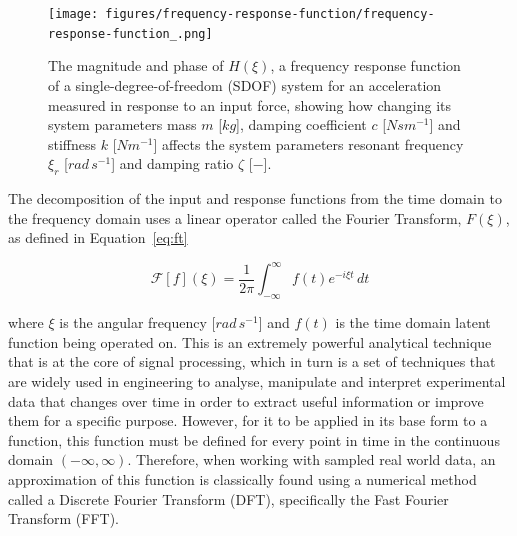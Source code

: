 \documentclass[12pt]{article}
\begin{document}
    \begin{figure}[ht]
        \centering
        \texttt{[image: figures/frequency-response-function/frequency-response-function\_.png]}
        \caption{The magnitude and phase of $H(\xi)$, a frequency response function of a single-degree-of-freedom (SDOF) system for an acceleration measured in response to an input force, showing how changing its system parameters mass $m$ [$kg$], damping coefficient $c$ [$N s m^{-1}$] and stiffness $k$ [$N m^{-1}$] affects the system parameters resonant frequency $\xi_r$ [$rad \, s^{-1}$] and damping ratio $\zeta$ [$-$].}
        \label{fig:frequency-response-function}
    \end{figure}

    The decomposition of the input and response functions from the time domain to the frequency domain uses a linear operator called the Fourier Transform, $F(\xi)$, as defined in Equation~\ref{eq:ft}

    \begin{equation}
        \mathcal{F}[f](\xi) = \frac{1}{2 \pi} \int_{-\infty}^{\infty} f(t) e^{-i \xi t} \, dt\label{eq:ft}
    \end{equation}


    \noindent where $\xi$ is the angular frequency [$rad \, s^{-1}$] and $f(t)$ is the time domain latent function being operated on.
    This is an extremely powerful analytical technique that is at the core of signal processing, which in turn is a set of techniques that are widely used in engineering to analyse, manipulate and interpret experimental data that changes over time in order to extract useful information or improve them for a specific purpose.
    However, for it to be applied in its base form to a function, this function must be defined for every point in time in the continuous domain $(-\infty, \infty)$.
    Therefore, when working with sampled real world data, an approximation of this function is classically found using a numerical method called a Discrete Fourier Transform (DFT), specifically the Fast Fourier Transform (FFT).
\end{document}
